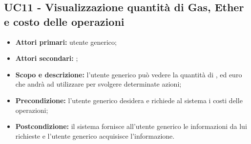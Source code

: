 \documentclass[AnalisiDeiRequisiti.tex]{subfiles}
\begin{document}
\subsection{UC11 - Visualizzazione quantità di Gas, Ether e costo delle operazioni}
\begin{itemize}
	\item \textbf{Attori primari:} utente generico;
	\item \textbf{Attori secondari:} ;
	\item \textbf{Scopo e descrizione:} l'utente generico può vedere la quantità di ,  ed euro che andrà ad utilizzare per svolgere determinate azioni;
	\item \textbf{Precondizione:} l'utente generico desidera e richiede al sistema i costi delle operazioni;
	\item \textbf{Postcondizione:} il sistema fornisce all'utente generico le informazioni da lui richieste e l'utente generico acquisisce l'informazione.
\end{itemize}
\end{document}
